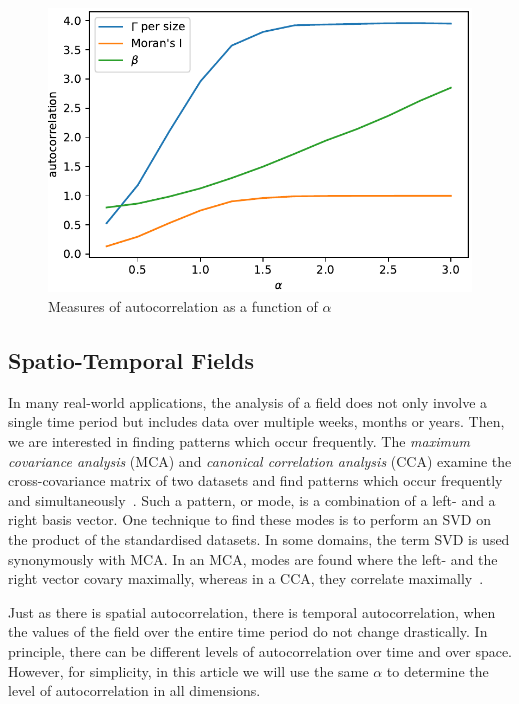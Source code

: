 \documentclass[sigconf]{acmart}
\begin{document}
\begin{figure}[h]
\begin{center}
\includegraphics[width=0.8\columnwidth]{Results/plotGammaAndMoransIAndBeta.pdf}
\caption[Various measures of autocorrelation]{Measures of autocorrelation as a function of $\alpha$}
\label{fig:plotGammaAndMoransIAndBeta}
\end{center}
\end{figure}

\subsection{Spatio-Temporal Fields}
\label{sec:Introduction Spatio-Temporal Fields}

In many real-world applications, the analysis of a field does not only involve a single time period but includes data over multiple weeks, months or years. Then, we are interested in finding patterns which occur frequently. The \textit{maximum covariance analysis} (MCA) and \textit{canonical correlation analysis} (CCA) examine the cross-covariance matrix of two datasets and find patterns which occur frequently and simultaneously~\cite{Eshel2011, Storch1999}. Such a pattern, or mode, is a combination of a left- and a right basis vector. One technique to find these modes is to perform an SVD on the product of the standardised datasets. In some domains, the term SVD is used synonymously with MCA. In an MCA, modes are found where the left- and the right vector covary maximally, whereas in a CCA, they correlate maximally~\cite{Bretherton1992}.

Just as there is spatial autocorrelation, there is temporal autocorrelation, when the values of the field over the entire time period do not change drastically. In principle, there can be different levels of autocorrelation over time and over space. However, for simplicity, in this article we will use the same $\alpha$ to determine the level of autocorrelation in all dimensions.
\end{document}
